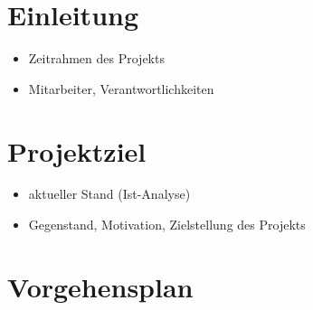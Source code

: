 \documentclass[12pt, oneside, smallheadings]{scrbook}
\begin{document}



\setcounter{page}{1}
\setcounter{tocdepth}{1}

\clearpage
{}
\tableofcontents
\thispagestyle{plain}

\printglossary[type=\acronymtype, title=Akronymverzeichnis,toctitle=Akronymverzeichnis]

\listoftables
{}



\clearpage
{}
\setcounter{page}{1}

\pagestyle{scrheadings}

\chapter{Einleitung} 
\begin{itemize}
	\item Zeitrahmen des Projekts
	\item Mitarbeiter, Verantwortlichkeiten
\end{itemize}

\chapter{Projektziel}
\begin{itemize}
	\item aktueller Stand (Ist-Analyse)
	\item Gegenstand, Motivation, Zielstellung des Projekts
\end{itemize}

\chapter{Vorgehensplan}
\end{document}
